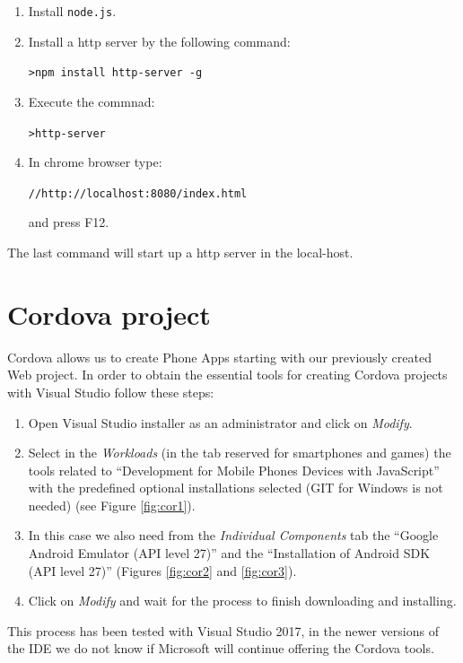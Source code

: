 \begin{enumerate}[nosep] 
	\item Install \verb|node.js|. 
	\item Install a http server by the following command:
	
	      \verb|>npm install http-server -g|
	      
	\item Execute the commnad: 
    
      \verb|>http-server|
      
	\item  In chrome browser type:
    
     \verb|//http://localhost:8080/index.html|
     
      and press F12. 
\end{enumerate} 

The last command will start up a http server in the local-host. 
    


    \FloatBarrier
    \section{Cordova project}

Cordova allows us to create Phone Apps starting with our previously created Web project. In order to obtain the essential tools for creating Cordova projects with Visual Studio follow these steps:

\begin{enumerate}
    \item Open Visual Studio installer as an administrator and click on \textit{Modify}.
    \item Select in the \textit{Workloads} (in the tab reserved for smartphones and games) the tools related to ``Development for Mobile Phones Devices with JavaScript'' with the predefined optional installations selected (GIT for Windows is not needed) (see Figure \ref{fig:cor1}).
    \item In this case we also need from the \textit{Individual Components} tab the ``Google Android Emulator (API level 27)'' and the ``Installation of Android SDK (API level 27)'' (Figures \ref{fig:cor2} and \ref{fig:cor3}).
    \item Click on \textit{Modify} and wait for the process to finish downloading and installing.
\end{enumerate}

\begin{IN}
    This process has been tested with Visual Studio 2017, in the newer versions of the IDE we do not know if Microsoft will continue offering the Cordova tools.
\end{IN}

